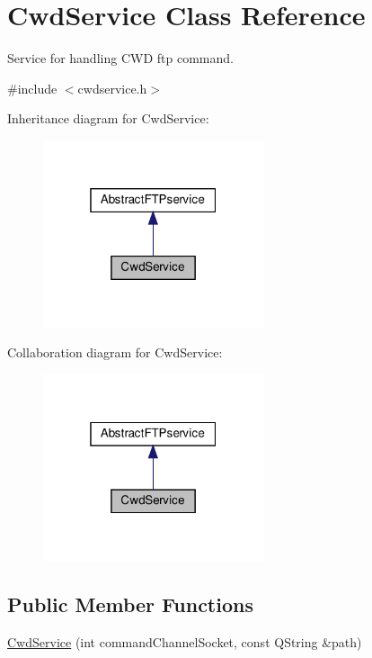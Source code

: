 \hypertarget{classCwdService}{}\section{Cwd\+Service Class Reference}
\label{classCwdService}


Service for handling C\+WD ftp command.  




{\ttfamily \#include $<$cwdservice.\+h$>$}



Inheritance diagram for Cwd\+Service\+:\nopagebreak
\begin{figure}[H]
\begin{center}
\leavevmode
\includegraphics[width=184pt]{d1/d34/classCwdService__inherit__graph}
\end{center}
\end{figure}


Collaboration diagram for Cwd\+Service\+:\nopagebreak
\begin{figure}[H]
\begin{center}
\leavevmode
\includegraphics[width=184pt]{d5/d23/classCwdService__coll__graph}
\end{center}
\end{figure}
\subsection*{Public Member Functions}
\begin{DoxyCompactItemize}
\item 
\hyperlink{classCwdService_a88204e4221cde51198702aad17cb5b31}{Cwd\+Service} (int command\+Channel\+Socket, const Q\+String \&path)
\end{DoxyCompactItemize}
